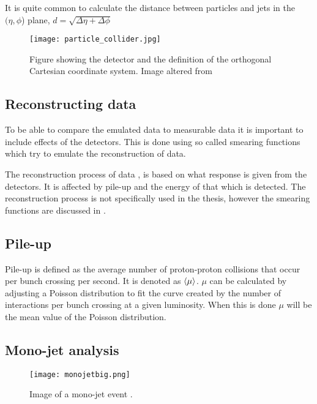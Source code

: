 It is quite common to calculate the distance between particles and jets in the $(\eta,\phi$) plane, $d=\sqrt{\Delta \eta + \Delta \phi}$  

\begin{figure}[ht]
\begin{center}
\texttt{[image: particle\_collider.jpg]}
\caption{Figure showing the \abbrATLAS detector and the definition of the orthogonal Cartesian coordinate system. Image altered from\citep{coordimage}}
\label{fig:coordinatesystem}
\end{center}
\end{figure}

\subsection{Reconstructing data}
To be able to compare the emulated data to measurable data it is important to include effects of the detectors. This is done using so called smearing functions which try to emulate the reconstruction of data. 

The reconstruction process of data \citep{1129811}, is based on what response is given from the detectors. It is affected by pile-up and the energy of that which is detected. 
The reconstruction process is not specifically used in the thesis, however the smearing functions are discussed in .

\subsection{Pile-up}\label{sec:eo:subsec:pile}

Pile-up is defined as the average number of proton-proton collisions that occur per bunch crossing per second. It is denoted as $\left<\mu\right>$. $\mu$ can be calculated by adjusting a Poisson distribution to fit the curve created by the number of interactions per bunch crossing at a given luminosity. When this is done $\mu$ will be the mean value of the Poisson distribution.


\subsection{Mono-jet analysis}\label{sec:eo:subsec:mjet}

\begin{figure}[ht]
\texttt{[image: monojetbig.png]}
\caption{Image of a mono-jet event \citep{monojet}.}
\label{fig:monojet}
\end{figure}

